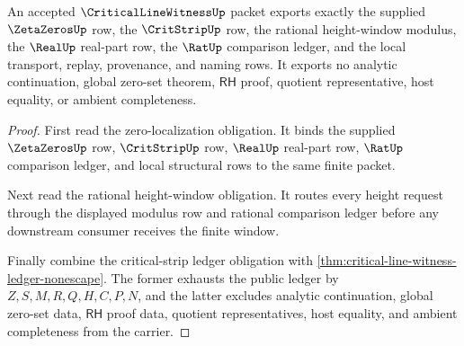 \begin{theorem}
\label{thm:critical-line-witness-public-export}
An accepted $\CriticalLineWitnessUp$ packet exports exactly the supplied $\ZetaZerosUp$ row, the $\CritStripUp$ row, the rational height-window modulus, the $\RealUp$ real-part row, the $\RatUp$ comparison ledger, and the local transport, replay, provenance, and naming rows. It exports no analytic continuation, global zero-set theorem, $\mathsf{RH}$ proof, quotient representative, host equality, or ambient completeness.
\end{theorem}
\begin{proof}
First read the zero-localization obligation. It binds the supplied $\ZetaZerosUp$ row, $\CritStripUp$ row, $\RealUp$ real-part row, $\RatUp$ comparison ledger, and local structural rows to the same finite packet.

Next read the rational height-window obligation. It routes every height request through the displayed modulus row and rational comparison ledger before any downstream consumer receives the finite window.

Finally combine the critical-strip ledger obligation with \autoref{thm:critical-line-witness-ledger-nonescape}. The former exhausts the public ledger by $Z,S,M,R,Q,H,C,P,N$, and the latter excludes analytic continuation, global zero-set data, $\mathsf{RH}$ proof data, quotient representatives, host equality, and ambient completeness from the carrier.
\end{proof}

